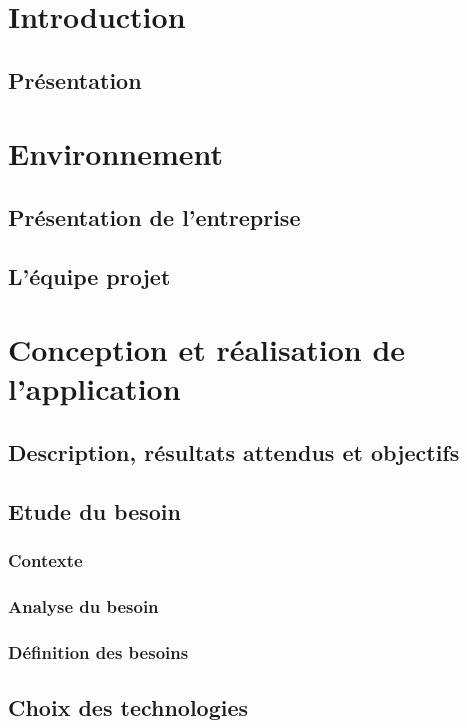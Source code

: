 \documentclass[a4paper, 11pt]{report}
\begin{document}
\chapter{Introduction}
\minitoc       

    \section{Présentation}

\chapter{Environnement}
\minitoc

    \section{Présentation de l'entreprise}
    \section{L'équipe projet}
    
\chapter{Conception et réalisation de l'application}
\minitoc 

    \section{Description, résultats attendus et objectifs}
    \section{Etude du besoin}
        \subsection{Contexte}
        \subsection{Analyse du besoin}
        \subsection{Définition des besoins}
        
    \section{Choix des technologies}
\end{document}
